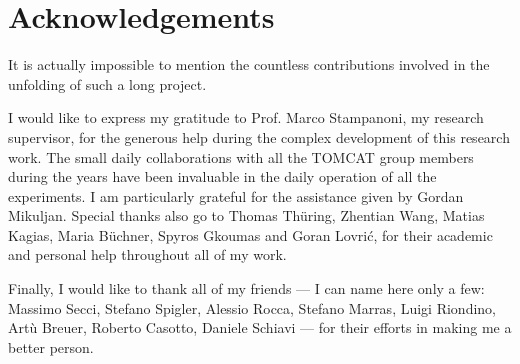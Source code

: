 
\bigskip

\begingroup
\let\clearpage\relax
\let\cleardoublepage\relax
\let\cleardoublepage\relax
\chapter*{Acknowledgements}
It is actually impossible to mention the countless contributions involved in
the unfolding of such a long project.

I would like to express my gratitude
to Prof. Marco Stampanoni, my research
supervisor, for the generous help during the complex development
of this research work. The small daily collaborations with all the TOMCAT
group members during the years have been invaluable in the daily operation
of all the experiments. I am particularly grateful for the assistance given
by Gordan Mikuljan.
Special thanks also go to Thomas Th\"uring, Zhentian Wang, Matias Kagias, Maria B\"uchner,
Spyros Gkoumas and Goran Lovri\'c, for their academic and personal help
throughout all of my work.

Finally, I would like to thank all of my friends --- I can name here only a
few: Massimo Secci, Stefano Spigler, Alessio Rocca, Stefano Marras, Luigi
Riondino, Art\`u Breuer, Roberto Casotto, Daniele Schiavi --- for their
efforts in making me a better person.
\endgroup
